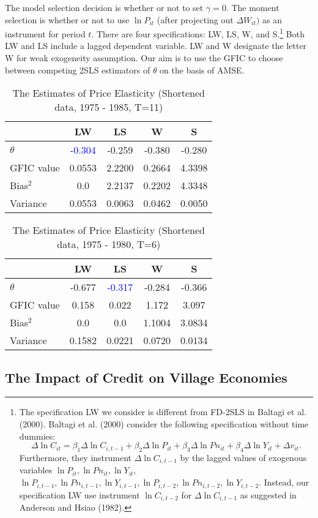 The model selection decision is whether or not to set $\gamma = 0$. The moment selection is whether or not to use $\ln P_{it}$ (after projecting out $\Delta W_{it})$ as an instrument for period $t$.  There are four specifications:  LW, LS, W, and S.\footnote{The specification LW we consider is different from FD-2SLS in Baltagi et al. (2000). Baltagi et al. (2000) consider the following specification without time dummies:
 \[
\Delta \ln C_{it} = \beta_1 \Delta \ln C_{i,t-1} +  \beta_2 \Delta \ln P_{it} +\beta_3 \Delta \ln Pn_{it} +  \beta_4 \Delta \ln Y_{it} + \Delta v_{it}.
\]
Furthermore, they instrument $\Delta \ln C_{i,t-1}$ by the lagged values of exogenous variables $\ln P_{it}, \ln Pn_{it}, \ln Y_{it},$ $\ln P_{i,t-1}, \ln Pn_{i,t-1}, \ln Y_{i,t-1}, \ln P_{i,t-2}, \ln Pn_{i,t-2}, \ln Y_{i,t-2}$. Instead, our specification LW use instrument $\ln C_{i, t-2}$ for $\Delta \ln C_{i,t-1}$ as suggested in Anderson and Hsiao (1982).}
 Both LW and LS include a lagged dependent variable. LW and W designate the letter W for weak exogeneity assumption. Our aim is to use the GFIC to choose between competing 2SLS estimators of $\theta$ on the basis of AMSE. %
\newpage


\begin{table}[h!]\centering
 \caption{The Estimates of Price Elasticity (Shortened data, 1975 - 1985, T=11)}
\begin{tabular}{l c c c c }\hline\hline 
 & LW   &      LS   &       W   &      S\\
\hline
$\theta$ & \textcolor{blue}{-0.304} & -0.259 &  -0.380 &  -0.280\\
\hline
GFIC value &0.0553 & 2.2200 & 0.2664 &  4.3398\\
Bias$^2$ & 0.0 & 2.2137 & 0.2202 & 4.3348\\
Variance & 0.0553 & 0.0063 & 0.0462 & 0.0050\\ 
\hline
\hline
\end{tabular}
\end{table}



\begin{table}[h!]\centering
 \caption{The Estimates of Price Elasticity (Shortened data, 1975 - 1980, T=6)}
\begin{tabular}{l c c c c }\hline\hline 
 & LW   &      LS   &       W   &      S\\
\hline
$\theta$ & -0.677 & \textcolor{blue}{ -0.317} &  -0.284 &  -0.366\\
\hline
GFIC value &0.158 & 0.022 & 1.172& 3.097\\
Bias$^2$ & 0.0 & 0.0 & 1.1004 & 3.0834\\
Variance &0.1582 & 0.0221 & 0.0720 & 0.0134\\ 
\hline
\hline
\end{tabular}
\end{table}


\subsection{The Impact of Credit on Village Economies}
\label{sec:townsend}
